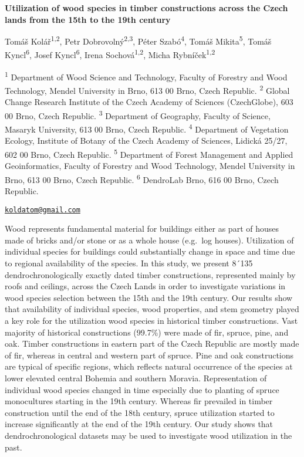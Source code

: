\documentclass[
]{book}
\begin{document}
\textbf{Utilization of wood species in timber constructions across the Czech lands from the 15th to the 19th century}

Tomáš Kolář\textsuperscript{1,2}, Petr Dobrovolný\textsuperscript{2,3}, Péter Szabó\textsuperscript{4}, Tomáš Mikita\textsuperscript{5}, Tomáš Kyncl\textsuperscript{6}, Josef Kyncl\textsuperscript{6}, Irena Sochová\textsuperscript{1,2}, Micha Rybníček\textsuperscript{1,2}

\textsuperscript{1} Department of Wood Science and Technology, Faculty of Forestry and Wood Technology, Mendel University in Brno, 613 00 Brno, Czech Republic. \textsuperscript{2} Global Change Research Institute of the Czech Academy of Sciences (CzechGlobe), 603 00 Brno, Czech Republic. \textsuperscript{3} Department of Geography, Faculty of Science, Masaryk University, 613 00 Brno, Czech Republic. \textsuperscript{4} Department of Vegetation Ecology, Institute of Botany of the Czech Academy of Sciences, Lidická 25/27, 602 00 Brno, Czech Republic. \textsuperscript{5} Department of Forest Management and Applied Geoinformatics, Faculty of Forestry and Wood Technology, Mendel University in Brno, 613 00 Brno, Czech Republic. \textsuperscript{6} DendroLab Brno, 616 00 Brno, Czech Republic.

\href{mailto:koldatom@gmail.com}{\nolinkurl{koldatom@gmail.com}}

Wood represents fundamental material for buildings either as part of houses made of bricks and/or stone or as a whole house (e.g.~log houses). Utilization of individual species for buildings could substantially change in space and time due to regional availability of the species. In this study, we present 8´135 dendrochronologically exactly dated timber constructions, represented mainly by roofs and ceilings, across the Czech Lands in order to investigate variations in wood species selection between the 15th and the 19th century. Our results show that availability of individual species, wood properties, and stem geometry played a key role for the utilization wood species in historical timber constructions. Vast majority of historical constructions (99.7\%) were made of fir, spruce, pine, and oak. Timber constructions in eastern part of the Czech Republic are mostly made of fir, whereas in central and western part of spruce. Pine and oak constructions are typical of specific regions, which reflects natural occurrence of the species at lower elevated central Bohemia and southern Moravia. Representation of individual wood species changed in time especially due to planting of spruce monocultures starting in the 19th century. Whereas fir prevailed in timber construction until the end of the 18th century, spruce utilization started to increase significantly at the end of the 19th century. Our study shows that dendrochronological datasets may be used to investigate wood utilization in the past.
\end{document}
